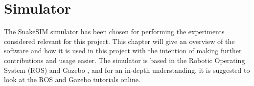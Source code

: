 \chapter{Simulator}\label{chapter:simulator}

The SnakeSIM simulator \cite{sanfilippo2018snakesim} has been chosen for performing the experiments considered relevant for this project. This chapter will give an overview of the software and how it is used in this project with the intention of making further contributions and usage easier. The simulator is based in the Robotic Operating System (ROS) \cite{quigley2009ros} and Gazebo \cite{koenig2004design}, and for an in-depth understanding, it is suggested to look at the ROS and Gazebo tutorials online.




%
%